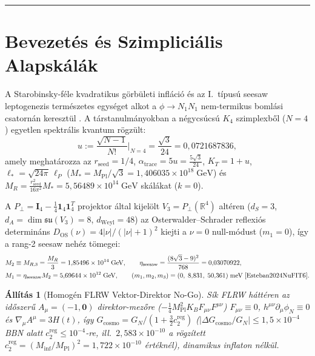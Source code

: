 \documentclass[11pt,a4paper]{article}
\newtheorem{proposition}[theorem]{Állítás}
\begin{document}
\tableofcontents
\vspace{0.4em}
\hrule
\vspace{0.8em}

\section{Bevezetés és Szimpliciális Alapskálák}
\label{sec:intro}

A Starobinsky-féle kvadratikus görbületi infláció \cite{Starobinsky1980,MukhanovChibisov1981} és az I.\ típusú seesaw leptogenezis \cite{FukugitaYanagida1986,BuchmullerDiBariPlumacher2005} természetes egységet alkot a $\phi \to N_1 N_1$ nem-termikus bomlási csatornán keresztül \cite{GorbunovPanin2011,Watanabe2011,GorbunovTokareva2013}. A társtanulmányokban \cite{Olcsak2026Zenodo} a négycsúcsú $K_4$ szimplexből ($N=4$) egyetlen spektrális kvantum rögzült:
\begin{equation}
u := \frac{\sqrt{N - 1}}{N!}\Bigg|_{N=4} = \frac{\sqrt{3}}{24} = 0{,}0721687836,
\end{equation}
amely meghatározza az $r_{\mathrm{seed}} = 1/4$, $\alpha_{\mathrm{trace}} = 5u = \frac{5\sqrt{3}}{24}$, $K_T = 1 + u$, $\ell_* = \sqrt{24\pi}\,\ell_P$ ($M_* = M_{\mathrm{Pl}}/\sqrt{3} = 1{,}406035\times 10^{18}\;\mathrm{GeV}$) és $M_R = \frac{r_{\mathrm{seed}}^2}{16\pi^2}M_* = 5{,}56489\times 10^{14}\;\mathrm{GeV}$ skálákat ($k=0$).

A $P_\perp = \mathbf{I}_4 - \frac{1}{4}\mathbf{1}_4\mathbf{1}_4^T$ projektor által kijelölt $V_3 = P_\perp(\mathbb{R}^4)$ altéren ($d_S = 3$, $d_A = \dim\mathfrak{su}(V_3) = 8$, $d_{\mathrm{Weyl}} = 48$) az Osterwalder--Schrader reflexiós determináns $D_{\mathrm{OS}}(\nu) = 4|\nu|/(|\nu|+1)^2$ kiejti a $\nu=0$ null-módust ($m_1 = 0$), így a rang-2 seesaw nehéz tömegei:
\begin{align}
M_2 &\equiv M_{R,3} = \frac{M_R}{3} = 1{,}85496\times 10^{14}\;\mathrm{GeV}, \qquad
\eta_{\mathrm{seesaw}} = \frac{(8\sqrt{3}-9)^2}{768} = 0{,}03070922, \nonumber\\
M_1 &= \eta_{\mathrm{seesaw}}M_2 = 5{,}69644\times 10^{12}\;\mathrm{GeV}, \qquad
(m_1, m_2, m_3) = (0,\;8{,}831,\;50{,}361)\;\mathrm{meV}\;\text{\cite{Esteban2024NuFIT6}}.
\end{align}

\begin{proposition}[Homogén FLRW Vektor-Direktor No-Go]
\label{prop:ir-nogo}
Sík FLRW háttéren az időszerű $A_\mu = (-1,\mathbf{0})$ direktor-mezőre ($-\frac{1}{4}M_{\mathrm{Pl}}^2 K_B F_{\mu\nu}F^{\mu\nu}$) $F_{\mu\nu} \equiv 0$, $h^{\mu\nu}\partial_\mu\phi_N \equiv 0$ és $\nabla_\mu A^\mu = 3H(t)$, így $G_{\mathrm{cosmo}} = G_N/(1 + \frac{3}{2}c_2^{\mathrm{reg}})$ ($|\Delta G_{\mathrm{cosmo}}/G_N| \le 1{,}5\times 10^{-4}$ BBN alatt $c_2^{\mathrm{reg}} \le 10^{-4}$-re, ill.\ $2{,}583\times 10^{-10}$ a rögzített $c_2^{\mathrm{reg}} = (M_{\mathrm{inf}}/M_{\mathrm{Pl}})^2 = 1{,}722\times 10^{-10}$ értéknél), dinamikus inflaton nélkül.
\end{proposition}
\end{document}
